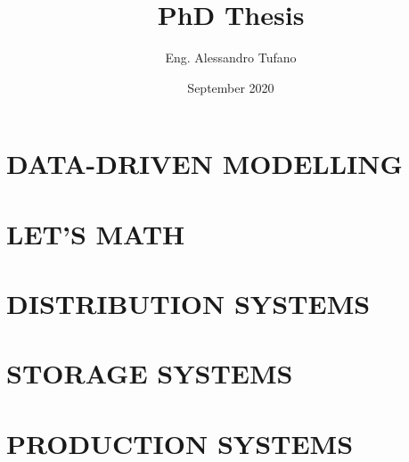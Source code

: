 \documentclass{book}
\title{PhD Thesis}
\author{Eng. Alessandro Tufano}
\date{September 2020}
\begin{document}
\frontmatter


\maketitle

%
%
%
%



\tableofcontents






\mainmatter

\part{DATA-DRIVEN MODELLING}







\part{LET'S MATH}











\part{DISTRIBUTION SYSTEMS}





\part{STORAGE SYSTEMS}





\part{PRODUCTION SYSTEMS}




\end{document}
